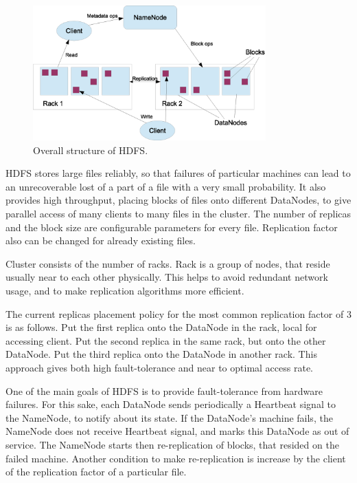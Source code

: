 \begin{figure}[h]
  \centering
  \includegraphics [width=0.8\textwidth]{images/HDFS}
  \caption{Overall structure of HDFS.}
  \label{fig:HDFS}
\end{figure}


HDFS stores large files reliably, so that failures of particular machines can lead to an unrecoverable lost of a part of a file with a very small probability.
It also provides high throughput, placing blocks of files onto different DataNodes, to give parallel access of many clients to many files in the cluster.
The number of replicas and the block size are configurable parameters for every file.
Replication factor also can be changed for already existing files.

Cluster consists of the number of racks.
Rack is a group of nodes, that reside usually near to each other physically.
This helps to avoid redundant network usage, and to make replication algorithms more efficient.

The current replicas placement policy for the most common replication factor of 3 is as follows.
Put the first replica onto the DataNode in the rack, local for accessing client.
Put the second replica in the same rack, but onto the other DataNode.
Put the third replica onto the DataNode in another rack.
This approach gives both high fault-tolerance and near to optimal access rate.


One of the main goals of HDFS is to provide fault-tolerance from hardware failures.
For this sake, each DataNode sends periodically a Heartbeat signal to the NameNode, to notify about its state.
If the DataNode's machine fails, the NameNode does not receive Heartbeat signal, and marks this DataNode as out of service.
The NameNode starts then re-replication of blocks, that resided on the failed machine.
Another condition to make re-replication is increase by the client of the replication factor of a particular file.

